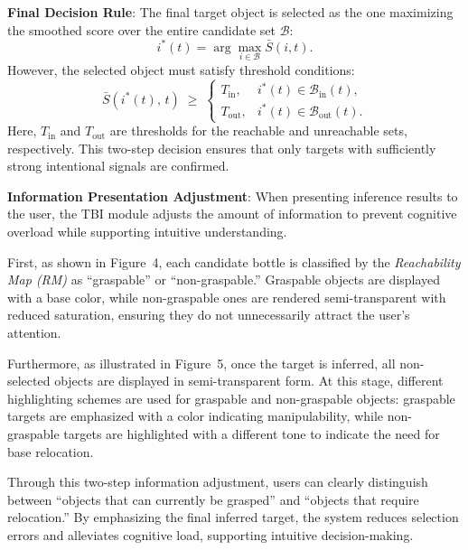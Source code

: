 \documentclass[../../main.tex]{subfiles} %
\begin{document}
\medskip
\textbf{Final Decision Rule}:  
The final target object is selected as the one maximizing the smoothed score over the entire candidate set $\mathcal{B}$:
\begin{equation}
i^*(t) = \arg\max_{i \in \mathcal{B}} \bar{S}(i,t).
\end{equation}
However, the selected object must satisfy threshold conditions:
\begin{equation}
  \bar{S}\!\left(i^{*}(t),\,t\right) \;\geq\;
  \begin{cases}
    T_{\text{in}},  & i^{*}(t) \in \mathcal{B}_{\text{in}}(t), \\[6pt]
    T_{\text{out}}, & i^{*}(t) \in \mathcal{B}_{\text{out}}(t).
  \end{cases}
\end{equation}
Here, $T_{\text{in}}$ and $T_{\text{out}}$ are thresholds for the reachable and unreachable sets, respectively.  
This two-step decision ensures that only targets with sufficiently strong intentional signals are confirmed.

\medskip
\textbf{Information Presentation Adjustment}:  
When presenting inference results to the user,  
the TBI module adjusts the amount of information to prevent cognitive 
overload while supporting intuitive understanding.  

First, as shown in Figure~4, each candidate bottle is classified by 
the \textit{Reachability Map (RM)} as “graspable” or “non-graspable.”  
Graspable objects are displayed with a base color,  
while non-graspable ones are rendered semi-transparent with reduced saturation,  
ensuring they do not unnecessarily attract the user’s attention.  

Furthermore, as illustrated in Figure~5,  
once the target is inferred, all non-selected objects are displayed in semi-transparent form.  
At this stage, different highlighting schemes are used for graspable and non-graspable objects:  
graspable targets are emphasized with a color indicating manipulability,  
while non-graspable targets are highlighted with a different tone to indicate the need for base relocation.  

Through this two-step information adjustment,  
users can clearly distinguish between “objects that can currently be grasped” 
and “objects that require relocation.”  
By emphasizing the final inferred target,  
the system reduces selection errors and alleviates cognitive load,  
supporting intuitive decision-making.
\end{document}
